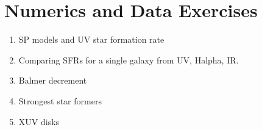 \section{Numerics and Data Exercises}

\begin{enumerate}
\item SP models and UV star formation rate
\item Comparing SFRs for a single galaxy from UV, Halpha, IR.
\item Balmer decrement
\item Strongest star formers
\item XUV disks
\end{enumerate}


  
